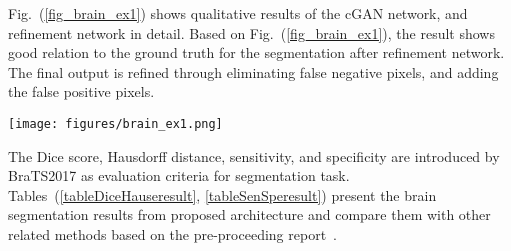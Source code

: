 \documentclass[10pt,twocolumn,letterpaper]{article}
\begin{document}
Fig.~(\ref{fig_brain_ex1}) shows qualitative results of the cGAN network, and refinement network in detail. Based on Fig.~(\ref{fig_brain_ex1}), the result shows good relation to the ground truth for the segmentation after refinement network. The final output is refined through eliminating false negative pixels, and adding the false positive pixels.

\begin{figure*}[!htbp]
\texttt{[image: figures/brain\_ex1.png]}
\centering
\caption{Visual results from our model on axial views of CBICA-AMF.nz.76-124 from the validation set. The first row shows Flair modality, while the second and fourth row show the output results respectively from cGAN and refinement architecture. The third row shows the semantic segmentation masks from cGAN overlaid Flair modalities where the fifth row shows outputs after refinement network. The red color codes the whole tumour (WT) region, while pink and yellow represent the enhanced tumour (ET) and the tumorous core (TC) respectively.}
\label{fig_brain_ex1}
\end{figure*}

The Dice score, Hausdorff distance, sensitivity, and specificity are introduced by BraTS2017 as evaluation criteria for segmentation task.
Tables~(\ref{tableDiceHauseresult}, \ref{tableSenSperesult}) present the brain segmentation results from proposed architecture and compare them with other related methods based on the pre-proceeding report~\cite{BRATS2017preproceeding}.
\end{document}
